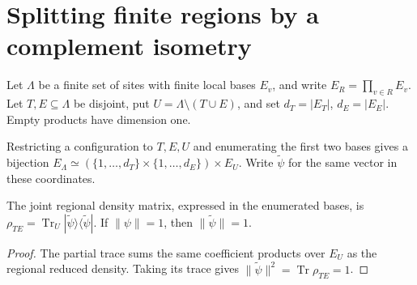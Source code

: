 \section{Splitting finite regions by a complement isometry}

Let $\Lambda$ be a finite set of sites with finite local bases $E_v$, and
write $E_R=\prod_{v\in R}E_v$. Let $T,E\subseteq\Lambda$ be disjoint,
put $U=\Lambda\setminus(T\cup E)$, and set $d_T=|E_T|$, $d_E=|E_E|$.
Empty products have dimension one.

\begin{definition}
    \label{def:finite_product_splitting_coordinates}
    \leanok
    Restricting a configuration to $T,E,U$ and enumerating the first two
    bases gives a bijection
    $E_\Lambda\simeq(\{1,\ldots,d_T\}\times\{1,\ldots,d_E\})\times E_U$.
    Write $\widetilde\psi$ for the same vector in these coordinates.
\end{definition}

\begin{theorem}
    \label{thm:finite_product_splitting_marginal}
    \leanok
    The joint regional density matrix, expressed in the enumerated bases,
    is $\rho_{TE}=\operatorname{Tr}_U
    |\widetilde\psi\rangle\langle\widetilde\psi|$.
    If $\|\psi\|=1$, then $\|\widetilde\psi\|=1$.
\end{theorem}
\begin{proof}\leanok
    The partial trace sums the same coefficient products over $E_U$ as
    the regional reduced density. Taking its trace gives
    $\|\widetilde\psi\|^2=\operatorname{Tr}\rho_{TE}=1$.
\end{proof}

